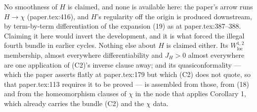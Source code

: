 \begin{lemma}
No smoothness of $H$ is claimed, and none is available here: the paper's arrow
runs $H\to\chi$ (paper.tex:416), and $H$'s regularity off the origin is
produced downstream, by term-by-term differentiation of the expansion (19) as
at paper.tex:387--388.  Claiming it here would invert the development, and it
is what forced the illegal fourth bundle in earlier cycles.  Nothing else about
$H$ is claimed either.  Its $W^{1,2}_{\mathrm{loc}}$ membership, almost
everywhere differentiability and $J_H>0$ almost everywhere are one application
of (C2)'s inverse clause away; and its quasiconformality --- which the paper
asserts flatly at paper.tex:179 but which (C2) does not quote, so that
paper.tex:113 requires it to be proved --- is assembled from those, from (18)
and from the homeomorphism clauses of $\chi$ in the node that applies
Corollary 1, which already carries the bundle (C2) and the $\chi$ data.
\end{lemma}
